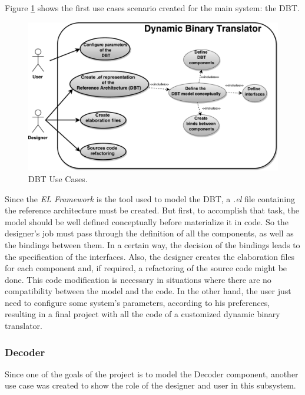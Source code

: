 \documentclass[12pt]{article}
\begin{document}
{Figure \ref{fig:DBTUseCases} shows the first use cases scenario created for the main system: the DBT.

\begin{figure}[!htb]
\centerline{
\includegraphics[scale=0.6]{images/DBT_UseCases.pdf} }
\caption{DBT Use Cases.}
\label{fig:DBTUseCases} 
\end{figure}

Since the \textit{EL Framework} is the tool used to model the DBT, a \textit{.el} file containing the reference architecture must be created. But first, to accomplish that task, the model should be well defined conceptually before materialize it in code. So the designer's job must pass through the definition of all the components, as well as the bindings between them. In a certain way, the decision of the bindings leads to the specification of the interfaces. Also, the designer creates the elaboration files for each component and, if required, a refactoring of the source code might be done. This code modification is necessary in situations where there are no compatibility between the model and the code. In the other hand, the user just need to configure some system's parameters, according to his preferences, resulting in a final project with all the code of a customized dynamic binary translator.

\subsubsection{Decoder}

Since one of the goals of the project is to model the Decoder component, another use case was created to show the role of the designer and user in this subsystem. 

}
\end{document}
